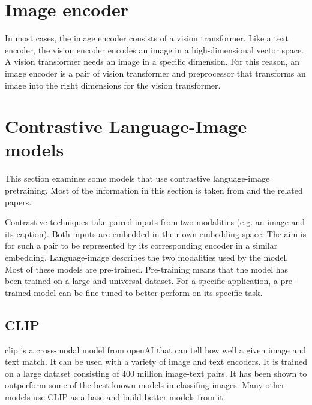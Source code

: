     \section{Image encoder}
    In most cases, the image encoder consists of a vision transformer\cite{Vis_N_Grams}.
    Like a text encoder, the vision encoder encodes an image in a high-dimensional vector space.
    A vision transformer needs an image in a specific dimension.
    For this reason, an image encoder is a pair of vision transformer and preprocessor that transforms an image into the right dimensions for the vision transformer.

    
    \section{Contrastive Language-Image models
        \label{section:languageimagemodels}}
        This section examines some models that use contrastive language-image pretraining.
        Most of the information in this section is taken from \cite{cliplikeweb} and the related papers.

        Contrastive techniques take paired inputs from two modalities (e.g. an image and its caption).
        Both inputs are embedded in their own embedding space.
        The aim is for such a pair to be represented by its corresponding encoder in a similar embedding.
        Language-image describes the two modalities used by the model.
        Most of these models are pre-trained.
        Pre-training means that the model has been trained on a large and universal dataset.
        For a specific application, a pre-trained model can be fine-tuned to better perform on its specific task.

        \subsection{CLIP
            \label{section:clip}}
        \acrfull{clip} \cite{clip} is a cross-modal model from openAI\cite{openai} that can tell how well a given image and text match.
        It can be used with a variety of image and text encoders.
        It is trained on a large dataset consisting of 400 million image-text pairs.
        It has been shown to outperform some of the best known models in classifing images.
        Many other models use CLIP as a base and build better models from it.

